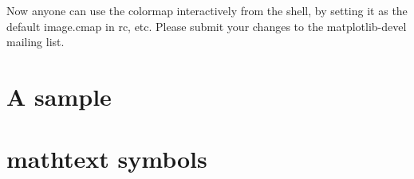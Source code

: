 \documentclass[twoside]{book}
\begin{document}
\noindent Now anyone can use the colormap interactively from the shell, by
setting it as the default image.cmap in rc, etc.  Please submit your
changes to the matplotlib-devel mailing list.

\appendix

\chapter{A sample }
\label{cha:rc}


\chapter{mathtext symbols}
\label{cha:math_symbols}



\end{document}
